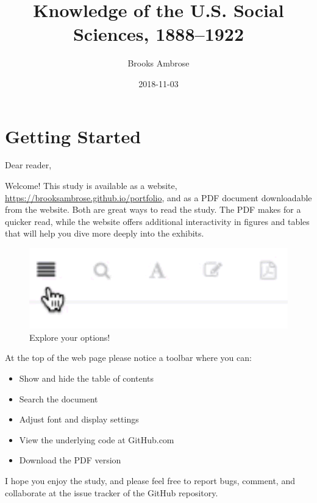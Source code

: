 \documentclass[]{book}
\title{Knowledge of the U.S. Social Sciences, 1888--1922}
\author{Brooks Ambrose}
\date{2018-11-03}
\providecommand{\tightlist}{%
  \setlength{\itemsep}{0pt}\setlength{\parskip}{0pt}}
\begin{document}
\maketitle

{
\setcounter{tocdepth}{2}
\tableofcontents
}
\listoftables
\listoffigures
\chapter*{Getting Started}\label{getting-started}


Dear reader,

Welcome! This study is available as a website,
\url{https://brooksambrose.github.io/portfolio}, and as a PDF document
downloadable from the website. Both are great ways to read the study.
The PDF makes for a quicker read, while the website offers additional
interactivity in figures and tables that will help you dive more deeply
into the exhibits.

\begin{figure}

{\centering \includegraphics{img/toolbar} 

}

\caption{Explore your options!}\label{fig:toolbar}
\end{figure}

At the top of the web page please notice a toolbar where you can:

\begin{itemize}
\tightlist
\item
  Show and hide the table of contents
\item
  Search the document
\item
  Adjust font and display settings
\item
  View the underlying code at GitHub.com
\item
  Download the PDF version
\end{itemize}

I hope you enjoy the study, and please feel free to report bugs,
comment, and collaborate at the issue tracker of the GitHub repository.
\end{document}
